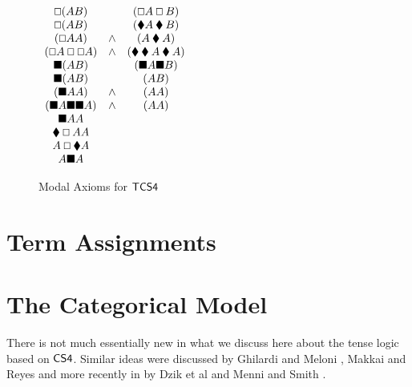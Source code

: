\documentclass{article}
\let\Diamond\relax
\newcommand{\bLozenge}{\mathbin{\blacklozenge}}
\let\to\relax
\newcommand{\to}{\rightarrow}
\renewcommand{\Box}{\oblong}
\begin{document}
\begin{figure}
  \begin{mdframed}
  \begin{center}
      \begin{math}
        \begin{array}{ccc}
        \Box (A \to B) &\to &(\Box A \to \Box B)\\
        \Box (A \to B) &\to &(\bLozenge A\to \bLozenge B)\\
        (\Box A\to A) &\land &(A\to \bLozenge A)\\
        (\Box A\to \Box\Box A) &\land &(\bLozenge \bLozenge A \to \bLozenge A)\\
        \blacksquare (A \to B) &\to &(\blacksquare A \to \blacksquare B)\\
        \blacksquare (A \to B) &\to &(\Diamond A\to \Diamond B)\\
        (\blacksquare A\to A) &\land &(A\to \Diamond A)\\
        (\blacksquare A\to \blacksquare\blacksquare A) &\land &(\Diamond \Diamond A \to \Diamond A)\\
        \Diamond \blacksquare A\to A\\
        \bLozenge\Box A\to A\\
        A\to \Box \bLozenge A\\
        A\to \blacksquare\Diamond A\\
        \end{array}
       \end{math}
\end{center}
 \end{mdframed}
  \caption{Modal Axioms for $\sf{TCS4}$}
  \label{axiomCS4}
\end{figure}

\section{Term Assignments}
\label{sec:term_assignments}




\section{The Categorical Model}
There is not much essentially new in what we discuss here about the tense logic based on $\sf{CS4}$. Similar ideas were discussed by  Ghilardi and Meloni \cite{ghilardi1988}, Makkai and Reyes \cite{makkai1995} and more recently in by Dzik et al \cite{dziketal2012} and Menni and Smith \cite{Menni:2014}.
\end{document}
